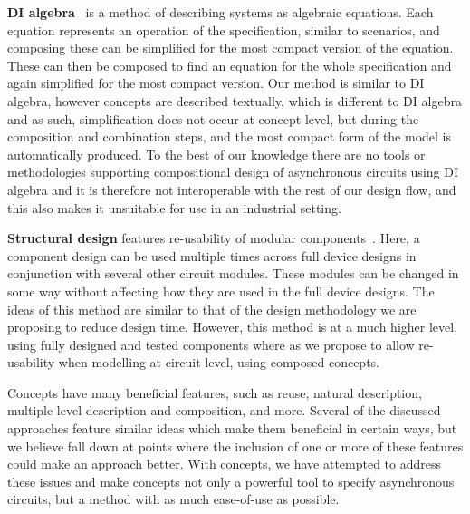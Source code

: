 \documentclass[british,compsoc]{IEEEtran}
\begin{document}
\textbf{DI algebra}~\cite{josephs1993overview} is a method of describing
systems as algebraic equations. Each equation represents an operation
of the specification, similar to scenarios, and composing these can
be simplified for the most compact version of the equation. These
can then be composed to find an equation for the whole specification
and again simplified for the most compact version. Our method is similar
to DI algebra, however concepts are described textually, which is
different to DI algebra and as such, simplification does not occur
at concept level, but during the composition and combination steps,
and the most compact form of the model is automatically produced.
To the best of our knowledge there are no tools or methodologies supporting
compositional design of asynchronous circuits using DI algebra and
it is therefore not interoperable with the rest of our design flow,
and this also makes it unsuitable for use in an industrial setting.

\textbf{Structural design} features re-usability of modular components~\cite{modular-circuit-design}.
Here, a component design can be used multiple times across full device
designs in conjunction with several other circuit modules. These modules
can be changed in some way without affecting how they are used in
the full device designs. The ideas of this method are similar to that
of the design methodology we are proposing to reduce design time.
However, this method is at a much higher level, using fully designed
and tested components where as we propose to allow re-usability when
modelling at circuit level, using composed concepts.

Concepts have many beneficial features, such as reuse, natural description, multiple level description and composition, and more. Several of the discussed approaches feature similar
ideas which make them beneficial in certain ways, but we believe fall down at points where the inclusion of one or more of these features could make an approach better. With concepts,
we have attempted to address these issues and make concepts not only a powerful tool to specify asynchronous circuits, but a method with as much ease-of-use as possible.

\end{document}

